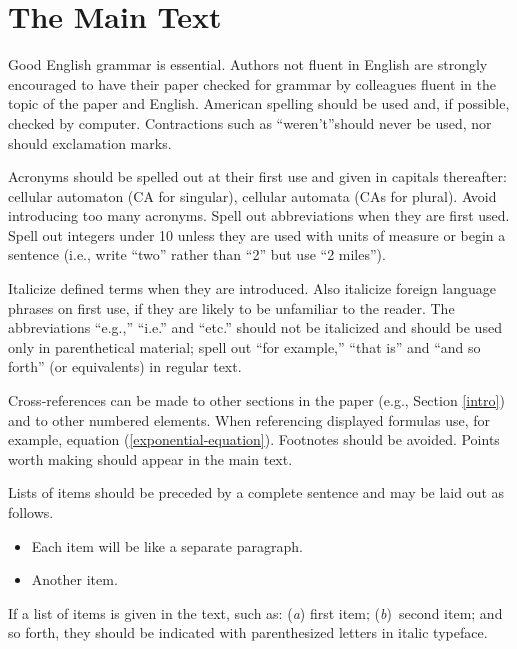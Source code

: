 \documentclass{article}
\begin{document}
\section{The Main Text}
\label{main-text}

Good English grammar is essential. Authors not fluent in English are strongly encouraged to have their paper checked for grammar by colleagues fluent in the topic of the paper and English. American spelling should be used and, if possible, checked by computer. Contractions such as {``}weren{'}t{''}should never be used, nor should exclamation marks.

Acronyms should be spelled out at their first use and given in capitals thereafter: cellular automaton (CA for singular), cellular automata (CAs for plural). Avoid introducing too many acronyms. Spell out abbreviations when they are first used. Spell out integers under 10 unless they are used with units of measure or begin a sentence (i.e., write {``}two{''} rather than {``}2{''} but use {``}2 miles{''}). 

Italicize defined terms when they are introduced. Also italicize foreign language phrases on first use, if they are likely to be unfamiliar to the reader. The abbreviations {``}e.g.,{''} {``}i.e.{''} and {``}etc.{''} should not be italicized and should be used only in parenthetical material; spell out {``}for example,{''} {``}that is{''} and {``}and so forth{''} (or equivalents) in regular text. 

Cross-references can be made to other sections in the paper (e.g., Section \ref{intro}) and to other numbered elements. When referencing displayed formulas use, for example, equation (\ref{exponential-equation}). Footnotes should be avoided. Points worth making should appear in the main text. 

Lists of items should be preceded by a complete sentence and may be laid out as follows.

\begin{itemize}
\item Each item will be like a separate paragraph. 

\item Another item. 
\end{itemize}

If a list of items is given in the text, such as: (\textit{a}) first item; (\textit{b})~second item; and so forth, they should be indicated with parenthesized letters in italic typeface.
\end{document}
